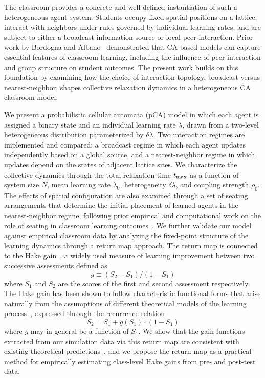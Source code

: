 \documentclass[a4paper,fleqn]{cas-sc}
\begin{document}
The classroom provides a concrete and well-defined instantiation of such a heterogeneous agent system.
Students occupy fixed spatial positions on a lattice, interact with neighbors under rules governed by individual learning rates, and are subject to either a broadcast information source or local peer interaction.
Prior work by Bordogna and Albano~\citep{bordogna2001theoretical, bordogna2003simulation} demonstrated that CA-based models can capture essential features of classroom learning, including the influence of peer interaction and group structure on student outcomes.
The present work builds on this foundation by examining how the choice of interaction topology, broadcast versus nearest-neighbor, shapes collective relaxation dynamics in a heterogeneous CA classroom model.

We present a probabilistic cellular automata (pCA) model in which each agent is assigned a binary state and an individual learning rate $\lambda$, drawn from a two-level heterogeneous distribution parameterized by $\delta\lambda$.
Two interaction regimes are implemented and compared: a broadcast regime in which each agent updates independently based on a global source, and a nearest-neighbor regime in which updates depend on the states of adjacent lattice sites.
We characterize the collective dynamics through the total relaxation time $t_{\rm max}$ as a function of system size $N$, mean learning rate $\lambda_0$, heterogeneity $\delta\lambda$, and coupling strength $\rho_0$.
The effects of spatial configuration are also examined through a set of seating arrangements that determine the initial placement of learned agents in the nearest-neighbor regime, following prior empirical and computational work on the role of seating in classroom learning outcomes~\citep{roxas2010seating, monterola2009}.
We further validate our model against empirical classroom data by analyzing the fixed-point structure of the learning dynamics through a return map approach.
The return map is connected to the Hake gain~\citep{hake1998}, a widely used measure of learning improvement between two successive assessments defined as
\begin{equation}
    g \equiv (S_2 - S_1) / (1 - S_1)
\end{equation}
where $S_1$ and $S_2$ are the scores of the first and second assessment respectively.
The Hake gain has been shown to follow characteristic functional forms that arise naturally from the assumptions of different theoretical models of the learning process~\citep{nitta2019mathematical, pritchard2008mathematical}, expressed through the recurrence relation
\begin{equation}
    S_2 = S_1 + g(S_1) \cdot (1 - S_1)
\end{equation}
where $g$ may in general be a function of $S_1$.
We show that the gain functions extracted from our simulation data via this return map are consistent with existing theoretical predictions~\citep{nitta2019mathematical, pritchard2008mathematical}, and we propose the return map as a practical method for empirically estimating class-level Hake gains from pre- and post-test data.
\end{document}
